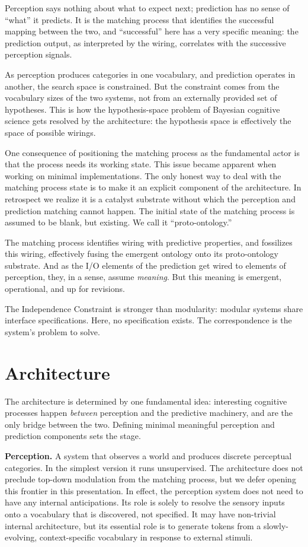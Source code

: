 \documentclass[12pt, a4paper]{article}
\begin{document}
Perception says nothing about what to expect next; prediction has no
sense of ``what'' it predicts. It is the matching process that identifies
the successful mapping between the two, and ``successful'' here has a
very specific meaning: the prediction output, as interpreted by the
wiring, correlates with the successive perception signals.

As perception produces categories in one vocabulary, and prediction
operates in another, the search space is constrained. But the constraint
comes from the vocabulary sizes of the two systems, not from an
externally provided set of hypotheses. This is how the
hypothesis-space problem of Bayesian cognitive science gets resolved by
the architecture: the hypothesis space is effectively the space of
possible wirings.

One consequence of positioning the matching process as the fundamental
actor is that the process needs its working state. This issue became
apparent when working on minimal implementations. The only honest way
to deal with the matching process state is to make it an explicit
component of the architecture. In retrospect we realize it is a catalyst
substrate without which the perception and prediction matching cannot
happen. The initial state of the matching process is assumed to be
blank, but existing. We call it ``proto-ontology.''

The matching process identifies wiring with predictive properties, and
fossilizes this wiring, effectively fusing the emergent ontology onto
its proto-ontology substrate. And as the I/O elements of the prediction
get wired to elements of perception, they, in a sense, assume
\textit{meaning}. But this meaning is emergent, operational, and up
for revisions.

The Independence Constraint is stronger than modularity: modular systems
share interface specifications. Here, no specification exists. The
correspondence is the system's problem to solve.

\section{Architecture}

The architecture is determined by one fundamental idea: interesting
cognitive processes happen \textit{between} perception and the
predictive machinery, and are the only bridge between the two. Defining
minimal meaningful perception and prediction components sets the stage.

\textbf{Perception.} A system that observes a world and produces
discrete perceptual categories. In the simplest version it runs
unsupervised. The architecture does not preclude top-down modulation
from the matching process, but we defer opening this frontier in this
presentation. In effect, the perception system does not need to have
any internal anticipations. Its role is solely to resolve the sensory
inputs onto a vocabulary that is discovered, not specified. It may have
non-trivial internal architecture, but its essential role is to generate
tokens from a slowly-evolving, context-specific vocabulary in response
to external stimuli.
\end{document}
